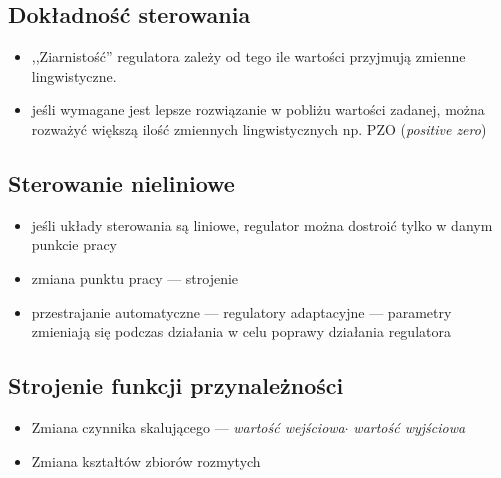 		\subsection{Dokładność sterowania}
			\begin{frame}
			\begin{itemize}
				\item 				,,Ziarnistość'' regulatora zależy od tego ile
				wartości przyjmują zmienne lingwistyczne.
				\item jeśli wymagane jest lepsze rozwiązanie w pobliżu wartości
				zadanej, można rozważyć większą ilość zmiennych lingwistycznych np.
				PZO (\emph{positive zero}) 
			\end{itemize}
			\end{frame}
			
			\subsection{Sterowanie nieliniowe}
			\begin{frame}
				\begin{itemize}
					\item jeśli układy sterowania są liniowe, regulator można dostroić tylko
					w danym punkcie pracy 
					
					\item zmiana punktu pracy --- strojenie
					
					\item przestrajanie automatyczne --- regulatory adaptacyjne ---
					parametry zmieniają się podczas działania w celu poprawy
					działania regulatora
				\end{itemize}
			\end{frame}
			
			\subsection{Strojenie funkcji przynależności}
				\begin{frame}
					\begin{itemize}
						\item Zmiana czynnika skalującego --- \emph{wartość wejściowa}$\cdot$
						\emph{wartość wyjściowa}
						
						\item Zmiana kształtów zbiorów rozmytych
					\end{itemize}
				\end{frame}

